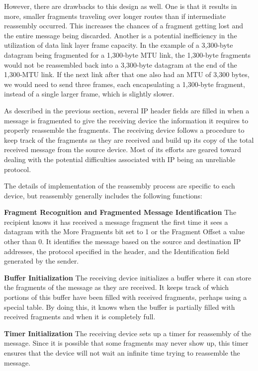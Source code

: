 \documentclass[b5paper,11pt]{memoir}
\begin{document}
However, there are drawbacks to this design as well. One is that it
results in more, smaller fragments traveling over longer routes than if
intermediate reassembly occurred. This increases the chances of a
fragment getting lost and the entire message being discarded. Another is
a potential inefficiency in the utilization of data link layer frame
capacity. In the example of a 3,300-byte datagram being fragmented for a
1,300-byte MTU link, the 1,300-byte fragments would not be reassembled
back into a 3,300-byte datagram at the end of the 1,300-MTU link. If the
next link after that one also had an MTU of 3,300 bytes, we would need
to send three frames, each encapsulating a 1,300-byte fragment, instead
of a single larger frame, which is slightly slower.

As described in the previous section, several IP header fields are
filled in when a message is fragmented to give the receiving device the
information it requires to properly reassemble the fragments. The
receiving device follows a procedure to keep track of the fragments as
they are received and build up its copy of the total received message
from the source device. Most of its efforts are geared toward dealing
with the potential difficulties associated with IP being an unreliable
protocol.

The details of implementation of the reassembly process are specific to
each device, but reassembly generally includes the following functions:

{\textbf{Fragment Recognition and Fragmented Message Identification}}
The recipient knows it has received a message fragment the first time it
sees a datagram with the More Fragments bit set to 1 or the Fragment
Offset a value other than 0. It identifies the message based on the
source and destination IP addresses, the protocol specified in the
header, and the Identification field generated by the sender.

{\textbf{Buffer Initialization}} The receiving device initializes a
buffer where it can store the fragments of the message as they are
received. It keeps track of which portions of this buffer have been
filled with received fragments, perhaps using a special table. By doing
this, it knows when the buffer is partially filled with received
fragments and when it is completely full.

{\textbf{Timer Initialization}} The receiving device sets up a timer for
reassembly of the message. Since it is possible that some fragments may
never show up, this timer ensures that the device will not wait an
infinite time trying to reassemble the message.
\end{document}
